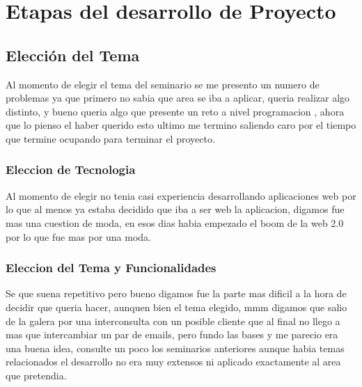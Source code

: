 \chapter{Etapas del desarrollo de Proyecto}

\section{Elecci\'on del Tema}

Al momento de elegir el tema del seminario se me presento un numero de 
problemas ya que primero no sabia que area se iba a aplicar, queria realizar 
algo distinto, y bueno queria algo que presente un reto a nivel programacion 
, ahora que lo pienso el haber querido esto ultimo me termino saliendo caro por
el tiempo que termine ocupando para terminar el proyecto. 


\subsection{Eleccion de Tecnologia}

Al momento de elegir no tenia casi experiencia desarrollando aplicaciones web 
por lo que al menos ya estaba decidido que iba a ser web la aplicacion, digamos 
fue mas una cuestion de moda, en esos dias habia empezado el boom de la web 2.0
por lo que fue mas por una moda.


\subsection{Eleccion del Tema y Funcionalidades}

Se que suena repetitivo pero bueno digamos fue la parte mas dificil a la hora 
de decidir que queria hacer, aunquen bien el tema elegido, mmm digamos que 
salio de la galera por una interconsulta con un posible cliente que al final no
llego a mas que intercambiar un par de emails, pero fundo las bases y me 
parecio era una buena idea, consulte un poco los seminarios anteriores aunque 
habia temas relacionados el desarrollo no era muy extensos ni aplicado 
exactamente al area que pretendia.\\[0.1cm]

